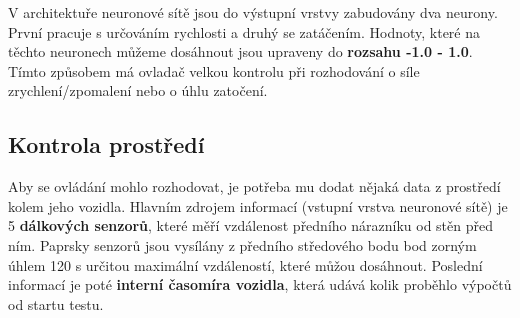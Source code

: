 \documentclass[a4paper,12pt]{article}
\newcommand{\tab}
{
    \hspace*{1em}
}
\begin{document}
            \tab V architektuře neuronové sítě jsou do výstupní vrstvy zabudovány dva neurony.
            První pracuje s určováním rychlosti a druhý se zatáčením. Hodnoty, které na těchto
            neuronech můžeme dosáhnout jsou upraveny do \textbf{rozsahu -1.0 - 1.0}. Tímto způsobem 
            má ovladač velkou kontrolu při rozhodování o síle zrychlení/zpomalení nebo o úhlu zatočení.

        \subsection{Kontrola prostředí}
            Aby se ovládání mohlo rozhodovat, je potřeba mu dodat nějaká data z prostředí kolem 
            jeho vozidla. Hlavním zdrojem informací (vstupní vrstva neuronové sítě) je 5
            \textbf{dálkových senzorů}, které měří vzdálenost předního nárazníku od stěn před ním.
            Paprsky senzorů jsou vysílány z předního středového bodu bod zorným úhlem 120\textdegree
            s určitou maximální vzdáleností, které můžou dosáhnout. Poslední informací 
            je poté \textbf{interní časomíra vozidla}, která udává kolik proběhlo výpočtů od startu testu. 
\end{document}
